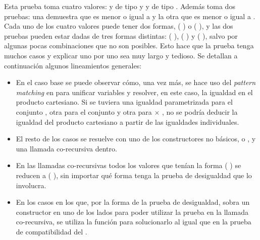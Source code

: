 \begin{AgdaAlign}

Esta prueba toma cuatro valores:  y  de tipo  \AgdaDatatype{$\bot$} y  y  de tipo  \AgdaDatatype{$\bot$}. Además toma dos pruebas: una demuestra que  es menor o igual a  y la otra que  es menor o igual a . Cada uno de los cuatro valores puede tener dos formas, ( ) o ( ), y las dos pruebas pueden estar dadas de tres formas distintas: ( ), ( ) y ( ), salvo por algunas pocas combinaciones que no son posibles. Esto hace que la prueba tenga muchos casos y explicar uno por uno sea muy largo y tedioso. Se detallan a continuación algunos lineamientos generales:
\begin{itemize}[noitemsep]
\item En el caso base se puede observar cómo, una vez más, se hace uso del \textit{pattern matching} en  para unificar variables y resolver, en este caso, la igualdad en el producto cartesiano. Si se tuviera una igualdad parametrizada para el conjunto , otra para el conjunto  y otra para  $\times$ , no se podría deducir la igualdad del producto cartesiano a partir de las igualdades individuales. 

\item El resto de los casos se resuelve con uno de los constructores no básicos,  o , y una llamada co-recursiva dentro. 

\item En las llamadas co-recursivas todos los valores que tenían la forma ( ) se reducen a (\AgdaField{$\flat$} ), sin importar qué forma tenga la prueba de desigualdad que lo involucra. 

\item En los casos en los que, por la forma de la prueba de desigualdad, sobra un constructor  en uno de los lados para poder utilizar la prueba en la llamada co-recursiva, se utiliza la función  para solucionarlo al igual que en la prueba de compatibilidad del .
\end{itemize}


\end{AgdaAlign}
